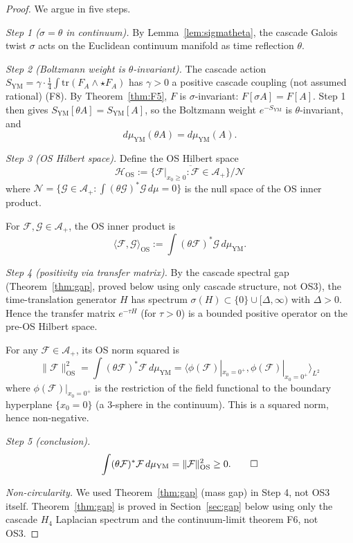 \documentclass[11pt, a4paper]{amsart}
\theoremstyle{definition}
\newcommand{\HH}{\mathcal{H}}
\newcommand{\A}{\mathcal{A}}
\begin{document}
\begin{proof}
We argue in five steps.

\emph{Step 1 ($\sigma = \theta$ in continuum).}
By Lemma~\ref{lem:sigmatheta}, the cascade Galois twist $\sigma$
acts on the Euclidean continuum manifold as time reflection $\theta$.

\emph{Step 2 (Boltzmann weight is $\theta$-invariant).}
The cascade action $S_{\mathrm{YM}} = \gamma \cdot \frac{1}{4}
\int \mathrm{tr}(F_A \wedge \star F_A)$ has $\gamma > 0$ a positive cascade coupling (not assumed rational)
(F8). By Theorem~\ref{thm:F5}, $F$ is $\sigma$-invariant:
$F[\sigma A] = F[A]$. Step 1 then gives $S_{\mathrm{YM}}[\theta A]
= S_{\mathrm{YM}}[A]$, so the Boltzmann weight $e^{-S_{\mathrm{YM}}}$
is $\theta$-invariant, and
\[
d\mu_{\mathrm{YM}}(\theta A) = d\mu_{\mathrm{YM}}(A).
\]

\emph{Step 3 (OS Hilbert space).}
Define the OS Hilbert space
\[
\HH_{\mathrm{OS}} := \overline{\{\mathcal{F}|_{x_0 \geq 0} :
\mathcal{F} \in \A_+\}} / \mathcal{N}
\]
where $\mathcal{N} = \{\mathcal{G} \in \A_+ : \int (\theta \mathcal{G})^*
\mathcal{G} \, d\mu = 0\}$ is the null space of the OS inner product.

For $\mathcal{F}, \mathcal{G} \in \A_+$, the OS inner product is
\[
\langle \mathcal{F}, \mathcal{G} \rangle_{\mathrm{OS}}
:= \int (\theta \mathcal{F})^* \mathcal{G} \, d\mu_{\mathrm{YM}}.
\]

\emph{Step 4 (positivity via transfer matrix).}
By the cascade spectral gap (Theorem~\ref{thm:gap}, proved below
using only cascade structure, not OS3), the time-translation
generator $H$ has spectrum $\sigma(H) \subset \{0\} \cup [\Delta, \infty)$
with $\Delta > 0$. Hence the transfer matrix $e^{-\tau H}$
(for $\tau > 0$) is a bounded positive operator on the pre-OS
Hilbert space.

For any $\mathcal{F} \in \A_+$, its OS norm squared is
\[
\|\mathcal{F}\|_{\mathrm{OS}}^2 = \int (\theta \mathcal{F})^*
\mathcal{F} \, d\mu_{\mathrm{YM}}
= \langle \phi(\mathcal{F})|_{x_0=0^+}, \phi(\mathcal{F})|_{x_0=0^+} \rangle_{L^2}
\]
where $\phi(\mathcal{F})|_{x_0=0^+}$ is the restriction of the field
functional to the boundary hyperplane $\{x_0 = 0\}$ (a 3-sphere in
the continuum). This is a squared norm, hence non-negative.

\emph{Step 5 (conclusion).}
\[
\int (\theta \mathcal{F})^* \mathcal{F} \, d\mu_{\mathrm{YM}} =
\|\mathcal{F}\|_{\mathrm{OS}}^2 \geq 0. \qed
\]

\emph{Non-circularity.} We used Theorem~\ref{thm:gap} (mass gap) in
Step 4, not OS3 itself. Theorem~\ref{thm:gap} is proved in
Section~\ref{sec:gap} below using only the cascade $H_4$ Laplacian
spectrum and the continuum-limit theorem F6, not OS3.
\end{proof}
\end{document}
